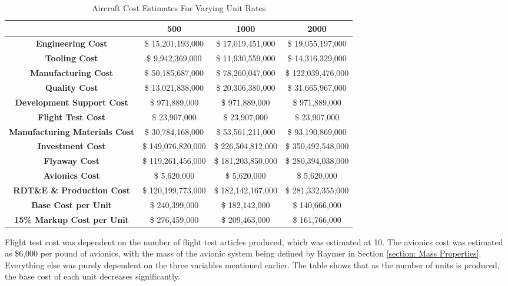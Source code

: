 \begin{table}[!h]
    \centering
        \caption{Aircraft Cost Estimates For Varying Unit Rates}
    \begin{tabular}{|c||c|c|c|}\toprule
         & \textbf{500} & \textbf{1000} & \textbf{2000} \\\hline \hline
         \textbf{Engineering Cost} & \$ 15,201,193,000 & \$ 17,019,451,000 & \$ 19,055,197,000 \\ \hline
         \textbf{Tooling Cost} & \$ 9,942,369,000 & \$ 11,930,559,000 & \$ 14,316,329,000 \\ \hline
         \textbf{Manufacturing Cost} & \$ 50,185,687,000 & \$ 78,260,047,000 & \$ 122,039,476,000 \\ \hline
         \textbf{Quality Cost} &  \$ 13,021,838,000  & \$ 20,306,380,000 & \$ 31,665,967,000 \\ \hline
         \textbf{Development Support Cost} & \$  971,889,000  & \$ 971,889,000 & \$ 971,889,000  \\ \hline
         \textbf{Flight Test Cost} &  \$ 23,907,000 & \$ 23,907,000 & \$ 23,907,000 \\ \hline
         \textbf{Manufacturing Materials Cost} &  \$   30,784,168,000    &  \$   53,561,211,000  &  \$   93,190,869,000 \\ \hline
         \textbf{Investment Cost} & \$  149,076,820,000  & \$  226,504,812,000  & \$  350,492,548,000  \\ \hline
         \textbf{Flyaway Cost} &  \$  119,261,456,000  &  \$  181,203,850,000  &  \$  280,394,038,000  \\ \hline
         \textbf{Avionics Cost} &  \$ 5,620,000 & \$ 5,620,000 & \$ 5,620,000  \\ \hline
         \textbf{RDT\&E \& Production Cost} &  \$  120,199,773,000  &  \$  182,142,167,000  &  \$  281,332,355,000   \\ \hline
         \textbf{Base Cost per Unit} &  \$  240,399,000  &  \$  182,142,000  &  \$  140,666,000  \\ \hline
         \textbf{15\% Markup Cost per Unit} &  \$  276,459,000 &  \$  209,463,000  &  \$  161,766,000 \\\bottomrule
    \end{tabular}
    \label{tab:prodcost}
\end{table}

Flight test cost was dependent on the number of flight test articles produced, which was estimated at 10. The avionics cost was estimated as \$6,000 per pound of avionics, with the mass of the avionic system being defined by Raymer \cite{raymer} in Section \ref{section: Mass Properties}. Everything else was purely dependent on the three variables mentioned earlier. The table shows that as the number of units is produced, the base cost of each unit decreases significantly. 

